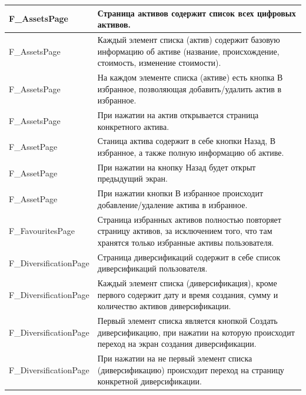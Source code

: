 \documentclass[a4paper, 14pt]{article}
\begin{document}
\begin{longtable}{| p{} | p{} |}
    F\_AssetsPage                & Страница активов содержит список всех цифровых активов.                                                                                                             \\ \hline
    F\_AssetsPage                & Каждый элемент списка (актив) содержит базовую информацию об активе (название, происхождение, стоимость, изменение стоимости).                                      \\ \hline
    F\_AssetsPage                & На каждом элементе списка (активе) есть кнопка В избранное, позволяющая добавить/удалить актив в избранное.                                                         \\ \hline
    F\_AssetsPage                & При нажатии на актив открывается страница конкретного актива.                                                                                                       \\ \hline

    F\_AssetPage                 & Станица актива содержит в себе кнопки Назад, В избранное, а также полную информацию об активе.                                                                      \\ \hline
    F\_AssetPage                 & При нажатии на кнопку Назад будет открыт предыдущий экран.                                                                                                          \\ \hline
    F\_AssetPage                 & При нажатии кнопки В избранное происходит добавление/удаление актива в избранное.                                                                                   \\ \hline

    F\_FavouritesPage            & Страница избранных активов полностью повторяет страницу активов, за исключением того, что там хранятся только избранные активы пользователя.                        \\ \hline

    F\_DiversificationPage       & Страница диверсификаций содержит в себе список диверсификаций пользователя.                                                                                         \\ \hline
    F\_DiversificationPage       & Каждый элемент списка (диверсификация), кроме первого содержит дату и время создания, сумму и количество активов диверсификации.                                    \\ \hline
    F\_DiversificationPage       & Первый элемент списка является кнопкой Создать диверсификацию, при нажатии на которую происходит переход на экран создания диверсификации.                          \\ \hline
    F\_DiversificationPage       & При нажатии на не первый элемент списка (диверсификацию) происходит переход на страницу конкретной диверсификации.                                                  \\ \hline


\end{longtable}
\end{document}
